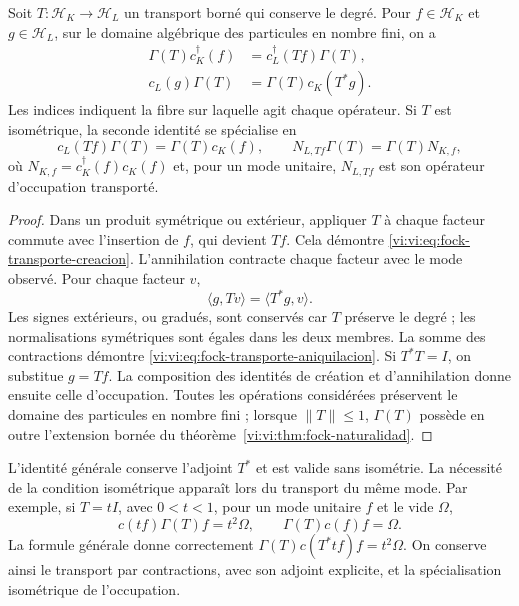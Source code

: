 \begin{proposition}
\label{vi:vi:prop:fock-transporte-adjunto}
Soit \(T:\mathcal H_K\to\mathcal H_L\) un transport borné
qui conserve le degré. Pour \(f\in\mathcal H_K\) et
\(g\in\mathcal H_L\), sur le domaine algébrique des particules
en nombre fini, on a
\begin{align}
 \Gamma(T)c_K^\dagger(f)
 &=c_L^\dagger(Tf)\Gamma(T),
 \label{vi:vi:eq:fock-transporte-creacion}\\
 c_L(g)\Gamma(T)
 &=\Gamma(T)c_K(T^*g).
 \label{vi:vi:eq:fock-transporte-aniquilacion}
\end{align}
Les indices indiquent la fibre sur laquelle agit chaque opérateur.
Si \(T\) est isométrique, la seconde identité se spécialise en
\[
 c_L(Tf)\Gamma(T)=\Gamma(T)c_K(f),
 \qquad
 N_{L,Tf}\Gamma(T)=\Gamma(T)N_{K,f},
\]
où \(N_{K,f}=c_K^\dagger(f)c_K(f)\) et, pour un mode unitaire,
\(N_{L,Tf}\) est son opérateur d’occupation transporté.
\end{proposition}
\begin{proof}
Dans un produit symétrique ou extérieur, appliquer \(T\) à chaque facteur
commute avec l’insertion de \(f\), qui devient \(Tf\). Cela
démontre \eqref{vi:vi:eq:fock-transporte-creacion}. L’annihilation
contracte chaque facteur avec le mode observé. Pour chaque facteur \(v\),
\[
 \langle g,Tv\rangle=\langle T^*g,v\rangle.
\]
Les signes extérieurs, ou gradués, sont conservés car \(T\)
préserve le degré ; les normalisations symétriques sont égales dans
les deux membres. La somme des contractions démontre
\eqref{vi:vi:eq:fock-transporte-aniquilacion}. Si \(T^*T=I\), on
substitue \(g=Tf\). La composition des identités de création
et d’annihilation donne ensuite celle d’occupation. Toutes les opérations
considérées préservent le domaine des particules en nombre fini ; lorsque
\(\|T\|\le1\), \(\Gamma(T)\) possède en outre l’extension bornée
du théorème~\ref{vi:vi:thm:fock-naturalidad}.
\end{proof}

L’identité générale conserve l’adjoint \(T^*\) et est valide sans
isométrie. La nécessité de la condition isométrique apparaît lors du
transport du même mode. Par exemple, si \(T=tI\), avec
\(0<t<1\), pour un mode unitaire \(f\) et le vide \(\Omega\),
\[
 c(tf)\Gamma(T)f=t^2\Omega,
 \qquad \Gamma(T)c(f)f=\Omega.
\]
La formule générale donne correctement
\(\Gamma(T)c(T^*tf)f=t^2\Omega\). On conserve ainsi le
transport par contractions, avec son adjoint explicite, et la
spécialisation isométrique de l’occupation.

